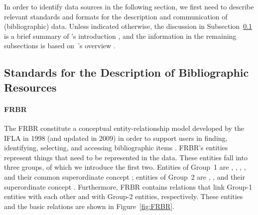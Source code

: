 In order to identify data sources in the following section,
we first need to describe relevant standards and formats for the description
and communication of (bibliographic) data.
Unless indicated otherwise, the discussion in Subsection~\ref{subsec:bib_standards}
is a brief summary of \citeauthor{Wiesenmueller2015}'s introduction
\autocite*[§§2,3]{Wiesenmueller2015}, and
the information in the remaining subsections
is based on~\citeauthor{Hider2008}'s overview \autocite*[§10]{Hider2008}.

\subsection{Standards for the Description of Bibliographic Resources}
\label{subsec:bib_standards}
\paragraph{FRBR}

The \gls{FRBR} constitute a conceptual entity-relationship model
developed by the \gls{IFLA} in 1998 (and updated in 2009)
in order to support users in finding, identifying, selecting, and accessing
bibliographic items \autocite[p.17]{Wiesenmueller2015}.
\gls{FRBR}'s entities represent things that need to be represented in the data.
These entities fall into three groups, of which we introduce the first
two.
Entities of Group~1 are , , , ,
and their common superordinate concept ;
entities of Group~2 are , ,
and their superordinate concept .
Furthermore, \gls{FRBR} contains relations that link Group-1 entities with each other
and with Group-2 entities, respectively.
These entities and the basic relations are shown in Figure~\ref{fig:FRBR}.

